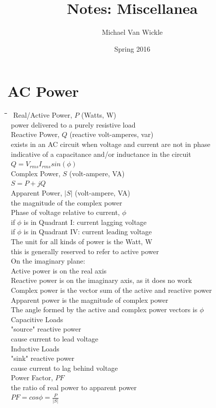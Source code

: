 \documentclass[10pt,letterpaper]{scrartcl}
\title{Notes: Miscellanea}
\author{Michael Van Wickle}
\date{Spring 2016}
\newcommand{\tbul}{\textbullet}
\newcommand{\tend}{\>\textendash}
\newcommand{\tabDef}{\hspace{2em}\=\hspace{2em}\=\hspace{2em}\=\hspace{2em}\=\kill}
\begin{document}
\maketitle\newpage\tableofcontents\newpage 

\section{AC Power}
\begin{tabbing}\tabDef 
	\tbul\ Real/Active Power, $P$ (Watts, W) \\
	\tend\ power delivered to a purely resistive load\\
	\tbul\ Reactive Power, $Q$ (reactive volt-amperes, var) \\
	\tend\ exists in an AC circuit when voltage and current are not in phase \\
	\tend\ indicative of a capacitance and/or inductance in the circuit \\
	\tend\ $\displaystyle Q = V_{rms}I_{rms}sin(\phi)$\\
	\tbul\ Complex Power, $S$ (volt-ampere, VA) \\
	\tend\ $\displaystyle S = P + jQ$\\
	\tbul\ Apparent Power, $|S|$ (volt-ampere, VA)\\
	\tend\ the magnitude of the complex power\\
	\tbul\ Phase of voltage relative to current, $\phi$\\
	\tend\ if $\phi$ is in Quadrant I: current lagging voltage\\
	\tend\ if $\phi$ is in Quadrant IV: current leading voltage\\
	\tbul\ The unit for all kinds of power is the Watt, W\\
	\tend\ this is generally reserved to refer to active power \\
	\tbul\ On the imaginary plane: \\
	\tend\ Active power is on the real axis\\
	\tend\ Reactive power is on the imaginary axis, as it does no work \\
	\tend\ Complex power is the vector sum of the active and reactive power\\
	\tend\ Apparent power is the magnitude of complex power\\
	\tend\ The angle formed by the active and complex power vectors is $\phi$ \\
	\tbul\ Capacitive Loads\\
	\tend\ "source" reactive power \\
	\tend\ cause current to lead voltage\\
	\tbul\ Inductive Loads \\
	\tend\ "sink" reactive power\\
	\tend\ cause current to lag behind voltage \\
	\tbul\ Power Factor, $PF$\\
	\tend\ the ratio of real power to apparent power \\
	\tend\ $\displaystyle PF = cos\phi = \frac{P}{|S|}$
\end{tabbing}
\end{document}
